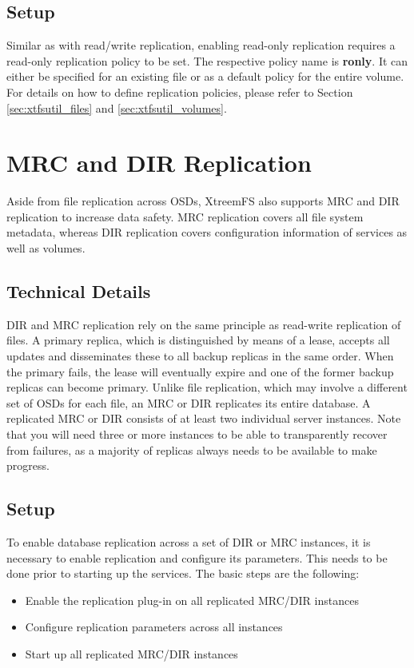 \documentclass[a4paper,10pt]{book}
\begin{document}
\subsection{Setup}
Similar as with read/write replication, enabling read-only replication requires a read-only replication policy to be set. The respective policy name is \textbf{ronly}. It can either be specified for an existing file or as a default policy for the entire volume. For details on how to define replication policies, please refer to Section \ref{sec:xtfsutil_files} and \ref{sec:xtfsutil_volumes}.


\section{MRC and DIR Replication}
Aside from file replication across OSDs, XtreemFS also supports MRC and DIR replication to increase data safety. MRC replication covers all file system metadata, whereas DIR replication covers configuration information of services as well as volumes.

\subsection{Technical Details}
DIR and MRC replication rely on the same principle as read-write replication of files. A primary replica, which is distinguished by means of a lease, accepts all updates and disseminates these to all backup replicas in the same order. When the primary fails, the lease will eventually expire and one of the former backup replicas can become primary. Unlike file replication, which may involve a different set of OSDs for each file, an MRC or DIR replicates its entire database. A replicated MRC or DIR consists of at least two individual server instances. Note that you will need three or more instances to be able to transparently recover from failures, as a majority of replicas always needs to be available to make progress.

\subsection{Setup}
To enable database replication across a set of DIR or MRC instances, it is necessary to enable replication and configure its parameters. This needs to be done prior to starting up the services. The basic steps are the following:

\begin{itemize}
 \item Enable the replication plug-in on all replicated MRC/DIR instances
 \item Configure replication parameters across all instances
 \item Start up all replicated MRC/DIR instances
\end{itemize}
\end{document}
